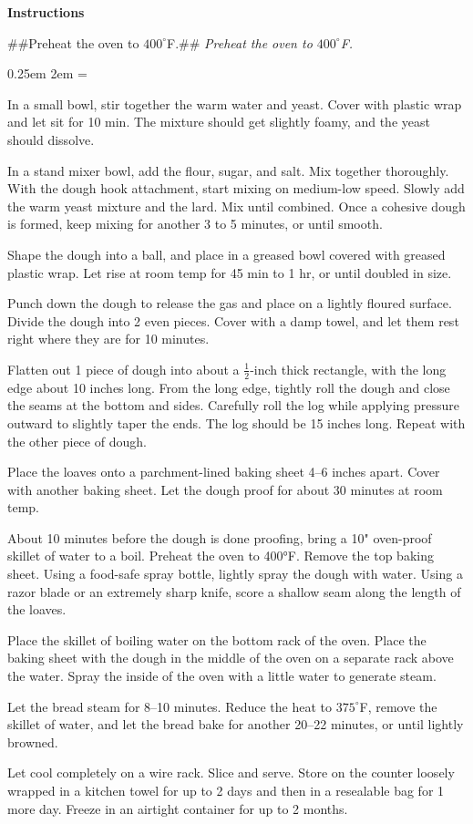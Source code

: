 \documentclass{article}
\newcommand{\temp}[1]{%
    $#1^\circ$F}
\newcounter{stepnum}
\newenvironment{method}[1][]{%
    \setcounter{stepnum}{0}
    \noindent
    {\color{red}\Large\textbf{Instructions}}%
    \par
    \smallskip
    \if###1##%
    \else
        \noindent
        \emph{#1}
        \par
    \fi
    \begingroup
    \parindent0pt
    \parskip0.25em
        \leftskip2em
    \everypar={\llap{\stepcounter{stepnum}\hbox to2em{\thestepnum.\hfill}}}
}{%
    \par
    \endgroup
    }
\begin{document}
\begin{method}[Preheat the oven to \temp{400}.]
    In a small bowl, stir together the warm water and yeast. Cover with plastic wrap and let sit for 10 min. The mixture should get slightly foamy, and the yeast should dissolve.

    In a stand mixer bowl, add the flour, sugar, and salt. Mix together thoroughly. With the dough hook attachment, start mixing on medium-low speed. Slowly add the warm yeast mixture and the lard. Mix until combined. Once a cohesive dough is formed, keep mixing for another 3 to 5 minutes, or until smooth.

    Shape the dough into a ball, and place in a greased bowl covered with greased plastic wrap. Let rise at room temp for 45 min to 1 hr, or until doubled in size.

    Punch down the dough to release the gas and place on a lightly floured surface. Divide the dough into 2 even pieces. Cover with a damp towel, and let them rest right where they are for 10 minutes.

    Flatten out 1 piece of dough into about a $\frac{1}{2}$-inch thick rectangle, with the long edge about 10 inches long. From the long edge, tightly roll the dough and close the seams at the bottom and sides.
    Carefully roll the log while applying pressure outward to slightly taper the ends. The log should be 15 inches long. Repeat with the other piece of dough.

    Place the loaves onto a parchment-lined baking sheet 4--6 inches apart. Cover with another baking sheet. Let the dough proof for about 30 minutes at room temp.

    About 10 minutes before the dough is done proofing, bring a 10" oven-proof skillet of water to a boil. Preheat the oven to 400°F. Remove the top baking sheet. Using a food-safe spray bottle, lightly spray the dough with water. Using a razor blade or an extremely sharp knife, score a shallow seam along the length of the loaves.

    Place the skillet of boiling water on the bottom rack of the oven. Place the baking sheet with the dough in the middle of the oven on a separate rack above the water. Spray the inside of the oven with a little water to generate steam.

    Let the bread steam for 8--10 minutes. Reduce the heat to \temp{375}, remove the skillet of water, and let the bread bake for another 20--22 minutes, or until lightly browned.

    Let cool completely on a wire rack. Slice and serve. Store on the counter loosely wrapped in a kitchen towel for up to 2 days and then in a resealable bag for 1 more day. Freeze in an airtight container for up to 2 months.


\end{method}
\end{document}
